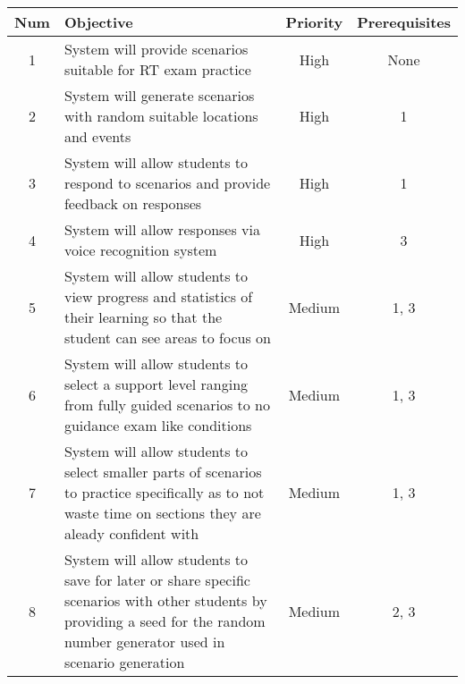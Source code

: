 \begin{center}
    \begin{tabular}{ | c | m{24em} | c | c | }
        \hline
        \bf{Num} & \bf{Objective} & \bf{Priority} & \bf{Prerequisites} \\
        \hline
        1 & System will provide scenarios suitable for RT exam practice & High & None \\
        \hline
        2 & System will generate scenarios with random suitable locations and events & High & 1 \\
        \hline
        3 & System will allow students to respond to scenarios and provide feedback on responses & High & 1 \\
        \hline
        4 & System will allow responses via voice recognition system & High & 3 \\
        \hline
        5 & System will allow students to view progress and statistics of their learning so that the student can see areas to focus on & Medium & 1, 3 \\
        \hline
        6 & System will allow students to select a support level ranging from fully guided scenarios to no guidance exam like conditions & Medium & 1, 3 \\
        \hline
        7 & System will allow students to select smaller parts of scenarios to practice specifically as to not waste time on sections they are aleady confident with & Medium & 1, 3 \\
        \hline
        8 & System will allow students to save for later or share specific scenarios with other students by providing a seed for the random number generator used in scenario generation & Medium & 2, 3 \\
        \hline
    \end{tabular}
\end{center}
